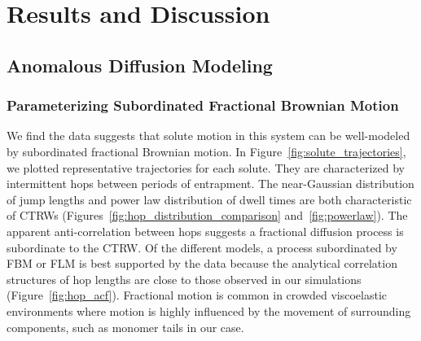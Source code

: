 \documentclass[journal=jctcce,manuscript=article]{achemso}
\begin{document}
  \section{Results and Discussion}
  
  \subsection{Anomalous Diffusion Modeling}\label{section:sFBM}
  
  \subsubsection{Parameterizing Subordinated Fractional Brownian Motion}\label{section:AD_parameterization}

  We find the data suggests that solute motion in this system can be
  well-modeled by subordinated fractional Brownian motion. In
  Figure~\ref{fig:solute_trajectories}, we plotted representative trajectories
  for each solute. They are characterized by intermittent hops between periods
  of entrapment. The near-Gaussian distribution of jump lengths and power law
  distribution of dwell times are both characteristic of CTRWs
  (Figures~\ref{fig:hop_distribution_comparison} and~\ref{fig:powerlaw}).  The
  apparent anti-correlation between hops suggests a fractional diffusion
  process is subordinate to the CTRW. Of the different models, a process
  subordinated by FBM or FLM is best supported by the data because the
  analytical correlation structures of hop lengths are close to those observed
  in our simulations (Figure~\ref{fig:hop_acf}). Fractional motion is common
  in crowded viscoelastic environments where motion is highly influenced by
  the movement of surrounding components, such as monomer tails in our
  case.~\cite{ernst_fractional_2012}
  
\end{document}
